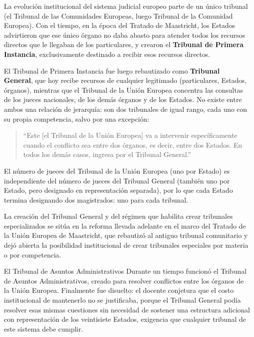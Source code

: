 \documentclass[12pt,oneside]{book}
\begin{document}
La evolución institucional del sistema judicial europeo parte de un único tribunal (el Tribunal de las Comunidades Europeas, luego Tribunal de la Comunidad Europea). Con el tiempo, en la época del Tratado de Maastricht, los Estados advirtieron que ese único órgano no daba abasto para atender todos los recursos directos que le llegaban de los particulares, y crearon el \textbf{Tribunal de Primera Instancia}, exclusivamente destinado a recibir esos recursos directos.

El Tribunal de Primera Instancia fue luego rebautizado como \textbf{Tribunal General}, que hoy recibe recursos de cualquier legitimado (particulares, Estados, órganos), mientras que el Tribunal de la Unión Europea concentra las consultas de los jueces nacionales, de los demás órganos y de los Estados. No existe entre ambos una relación de jerarquía: son dos tribunales de igual rango, cada uno con su propia competencia, salvo por una excepción:

\begin{quote}
“Este [el Tribunal de la Unión Europea] va a intervenir específicamente cuando el conflicto sea entre dos órganos, es decir, entre dos Estados. En todos los demás casos, ingresa por el Tribunal General.”
\end{quote}

El número de jueces del Tribunal de la Unión Europea (uno por Estado) es independiente del número de jueces del Tribunal General (también uno por Estado, pero designado en representación separada), por lo que cada Estado termina designando dos magistrados: uno para cada tribunal.

La creación del Tribunal General y del régimen que habilita crear tribunales especializados se sitúa en la reforma llevada adelante en el marco del Tratado de la Unión Europea de Maastricht, que rebautizó al antiguo tribunal comunitario y dejó abierta la posibilidad institucional de crear tribunales especiales por materia o por competencia.

\begin{example}{El Tribunal de Asuntos Administrativos}
Durante un tiempo funcionó el Tribunal de Asuntos Administrativos, creado para resolver conflictos entre los órganos de la Unión Europea. Finalmente fue disuelto: el docente conjetura que el costo institucional de mantenerlo no se justificaba, porque el Tribunal General podía resolver esas mismas cuestiones sin necesidad de sostener una estructura adicional con representación de los veintisiete Estados, exigencia que cualquier tribunal de este sistema debe cumplir.
\end{example}
\end{document}
